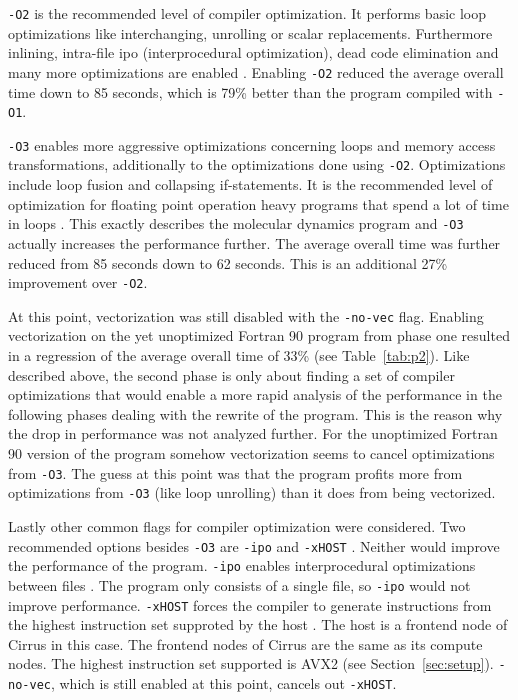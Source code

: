 \documentclass[twoside,11pt]{article}
\begin{document}
\texttt{-O2} is the recommended level of compiler optimization.
It performs basic loop optimizations like interchanging, unrolling or
scalar replacements.
Furthermore inlining, intra-file ipo (interprocedural optimization),
dead code elimination and many more optimizations are enabled
\citep{o}.
Enabling \texttt{-O2} reduced the average overall time down to
85 seconds, which is 79\% better than the program compiled with
\texttt{-O1}.

\texttt{-O3} enables more aggressive optimizations concerning loops
and memory access transformations, additionally to the optimizations
done using \texttt{-O2}.
Optimizations include loop fusion and collapsing if-statements.
It is the recommended level of optimization for floating point
operation heavy programs that spend a lot of time in loops
\citep{o}.
This exactly describes the molecular dynamics program and
\texttt{-O3} actually increases the performance further.
The average overall time was further reduced from 85 seconds down
to 62 seconds.
This is an additional 27\% improvement over \texttt{-O2}.

At this point, vectorization was still disabled with the
\texttt{-no-vec} flag.
Enabling vectorization on the yet unoptimized Fortran 90 program
from phase one resulted in a regression of the average overall time of
33\% (see Table~\ref{tab:p2}).
Like described above, the second phase is only about finding a
set of compiler optimizations that would enable a more rapid analysis
of the performance in the following phases dealing with the rewrite of
the program.
This is the reason why the drop in performance was not analyzed
further.
For the unoptimized Fortran 90 version of the program somehow
vectorization seems to cancel optimizations from \texttt{-O3}.
The guess at this point was that the program profits more from
optimizations from \texttt{-O3} (like loop unrolling) than it does
from being vectorized.

Lastly other common flags for compiler optimization were considered.
Two recommended options besides \texttt{-O3} are \texttt{-ipo} and
\texttt{-xHOST} \citep{user389}.
Neither would improve the performance of the program.
\texttt{-ipo} enables interprocedural optimizations between files
\citep{ipo}.
The program only consists of a single file, so \texttt{-ipo} would
not improve performance.
\texttt{-xHOST} forces the compiler to generate instructions from the
highest instruction set supproted by the host \citep{xhost}.
The host is a frontend node of Cirrus in this case.
The frontend nodes of Cirrus are the same as its compute nodes.
The highest instruction set supported is AVX2
(see Section~\ref{sec:setup}).
\texttt{-no-vec}, which is still enabled at this point, cancels out
\texttt{-xHOST}.
\end{document}
